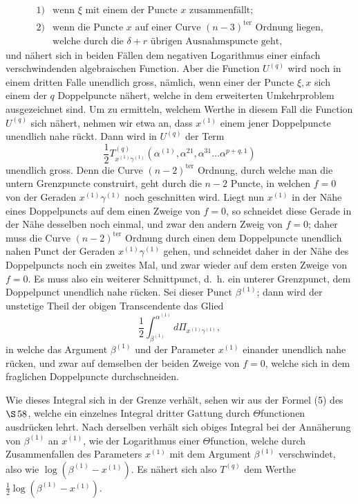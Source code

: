 \documentclass[10pt]{article}
\begin{document}
\[
\begin{array}{ll}
1)&\text{wenn }\xi\text{ mit einem der Puncte }x\text{ zusammenfällt;}\\
2)&\text{wenn die Puncte }x\text{ auf einer Curve }(n-3)^{\mathrm{ter}}\text{ Ordnung liegen,}\\
&\text{welche durch die }\delta+r\text{ übrigen Ausnahmspuncte geht,}
\end{array}
\]
und nähert sich in beiden Fällen dem negativen Logarithmus einer einfach verschwindenden algebraischen Function. Aber die Function \(U^{(q)}\) wird noch in einem dritten Falle unendlich gross, nämlich, wenn einer der Puncte \(\xi,x\) sich einem der \(q\) Doppelpuncte nähert, welche in dem erweiterten Umkehrproblem ausgezeichnet sind. Um zu ermitteln, welchem Werthe in diesem Fall die Function \(U^{(q)}\) sich nähert, nehmen wir etwa an, dass \(x^{(1)}\) einem jener Doppelpuncte unendlich nahe rückt. Dann wird in \(U^{(q)}\) der Term
\[
\frac12 T_{x^{(1)}\gamma^{(1)}}^{(q)}(\alpha^{(1)},\alpha^{21},\alpha^{31}\ldots\alpha^{p+q,1})
\]
unendlich gross. Denn die Curve \((n-2)^{\mathrm{ter}}\) Ordnung, durch welche man die untern Grenzpuncte construirt, geht durch die \(n-2\) Puncte, in welchen \(f=0\) von der Geraden \(x^{(1)}\gamma^{(1)}\) noch geschnitten wird. Liegt nun \(x^{(1)}\) in der Nähe eines Doppelpuncts auf dem einen Zweige von \(f=0\), so schneidet diese Gerade in der Nähe desselben noch einmal, und zwar den andern Zweig von \(f=0\); daher muss die Curve \((n-2)^{\mathrm{ter}}\) Ordnung durch einen dem Doppelpuncte unendlich nahen Punct der Geraden \(x^{(1)}\gamma^{(1)}\) gehen, und schneidet daher in der Nähe des Doppelpuncts noch ein zweites Mal, und zwar wieder auf dem ersten Zweige von \(f=0\). Es muss also ein weiterer Schnittpunct, d.\ h. ein unterer Grenzpunct, dem Doppelpunct unendlich nahe rücken. Sei dieser Punct \(\beta^{(1)}\); dann wird der unstetige Theil der obigen Transcendente das Glied
\[
\frac12\int_{\beta^{(1)}}^{\alpha^{(1)}}d\Pi_{x^{(1)}\gamma^{(1)}},
\]
in welche das Argument \(\beta^{(1)}\) und der Parameter \(x^{(1)}\) einander unendlich nahe rücken, und zwar auf demselben der beiden Zweige von \(f=0\), welche sich in dem fraglichen Doppelpuncte durchschneiden.

Wie dieses Integral sich in der Grenze verhält, sehen wir aus der Formel (5) des \(\S\,58\), welche ein einzelnes Integral dritter Gattung durch \(\Theta\)functionen ausdrücken lehrt. Nach derselben verhält sich obiges Integral bei der Annäherung von \(\beta^{(1)}\) an \(x^{(1)}\), wie der Logarithmus einer \(\Theta\)function, welche durch Zusammenfallen des Parameters \(x^{(1)}\) mit dem Argument \(\beta^{(1)}\) verschwindet, also wie \(\log(\beta^{(1)}-x^{(1)})\). Es nähert sich also \(T^{(q)}\) dem Werthe \(\frac12\log(\beta^{(1)}-x^{(1)})\).
\end{document}
